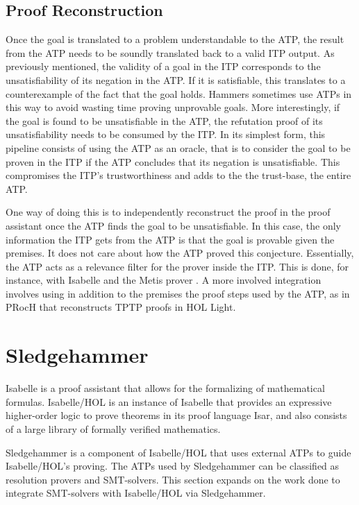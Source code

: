 \documentclass{article}
\begin{document}
		\subsection{Proof Reconstruction}
		Once the goal is translated to a problem understandable 
		to the ATP, the result from the ATP needs to be 
		soundly translated back to a valid ITP output.
		As previously mentioned, the validity of a goal in 
		the ITP corresponds to the unsatisfiability of its 
		negation in the ATP. If it is satisfiable, this 
		translates to a counterexample of the fact that 
		the goal holds. Hammers sometimes use ATPs 
		in this way to avoid wasting time proving 
		unprovable goals. More interestingly, if the 
		goal is found to be unsatisfiable in the ATP, 
		the refutation proof of its unsatisfiability
		needs to be consumed by the ITP. In its simplest form,
		this pipeline consists of using the ATP as an oracle, 
		that is to consider the goal to be proven in the 
		ITP if the ATP concludes that its negation is 
		unsatisfiable. This compromises the ITP's 
		trustworthiness and adds to the the trust-base, 
		the entire ATP.
		
		One way of doing this is to independently reconstruct 
		the proof in the proof assistant once the ATP finds 
		the goal to be unsatisfiable. In this case, the 
		only information the ITP gets from the ATP is that 
		the goal is provable given the premises. It does 
		not care about how the ATP proved this conjecture.
		Essentially, the ATP acts as a relevance filter for 
		the prover inside the ITP. This is done, for instance, 
		with Isabelle and the Metis prover 
		\cite{10.1007/978-3-540-74591-4_18}. A more involved
		integration involves using in addition to the premises
		the proof steps used by the ATP, as in PRocH
		\cite{10.1007/978-3-642-38574-2_18} that reconstructs 
		TPTP proofs in HOL Light.
		
\section{Sledgehammer}
\label{sec:hammer}
	Isabelle is a proof assistant that allows for the formalizing of mathematical 
	formulas. Isabelle/HOL is an instance of Isabelle that 
	provides an expressive higher-order logic to prove theorems 
	in its proof language Isar, and also consists of a large 
	library of formally verified mathematics. 
	
	Sledgehammer is a component of Isabelle/HOL that uses 
	external ATPs to guide Isabelle/HOL's proving. The ATPs 
	used by Sledgehammer can be classified as resolution 
	provers and SMT-solvers. This section expands on the work 
	done to integrate SMT-solvers with Isabelle/HOL via 
	Sledgehammer.
	
\end{document}
